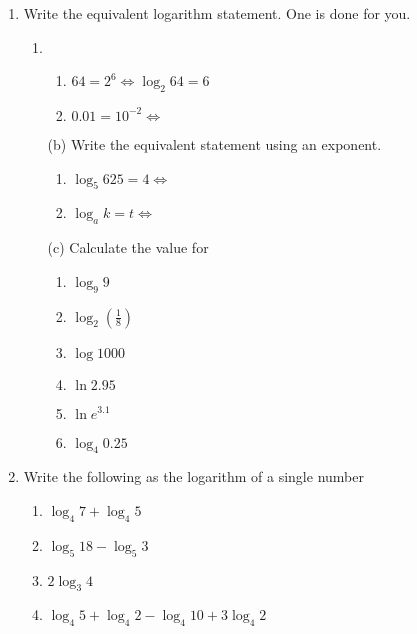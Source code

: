 \begin{enumerate}
	
	\item 
	Write the equivalent logarithm statement. One is done for you. 
	
	
	\begin{enumerate}
		\item
		\begin{enumerate}
			\item $64 =2^{6} \Leftrightarrow \log _{2} 64 =6$ 
			
			\item $0.01 =10^{ -2} \Leftrightarrow $ \end{enumerate}
		
		
		\item [(b)]
		Write the equivalent statement using an exponent. 
		
		
		\begin{enumerate}
			\item $\log _{5} 625 =4 \Leftrightarrow $ 
			
			\item $\log _{a} k =t \Leftrightarrow $ \end{enumerate}
		
		
		\item [(c)]
		Calculate the value for 
		
		
		\begin{enumerate}
			\item $\log _{9} 9$ 
			
			\item $\log _{2} \genfrac{(}{)}{}{}{1}{8}$ 
			
			\item $\log  1000$ 
			
			\item $\ln  2.95$ 
			
			\item $\ln  e^{3.1}$ 
			
			\item $\log _{4} 0.25$ \end{enumerate}
	\end{enumerate}

	\item Write the following as the logarithm of a single number 
	
	
	\begin{enumerate}
		\item $\log _{4} 7 +\log _{4} 5$ 
		
		\item $\log _{5} 18 -\log _{5} 3$ 
		
		\item $2 \log _{3} 4$ 
		
		\item $\log _{4} 5 +\log _{4} 2 -\log _{4} 10 +3 \log _{4} 2$ \end{enumerate}	
\end{enumerate}

